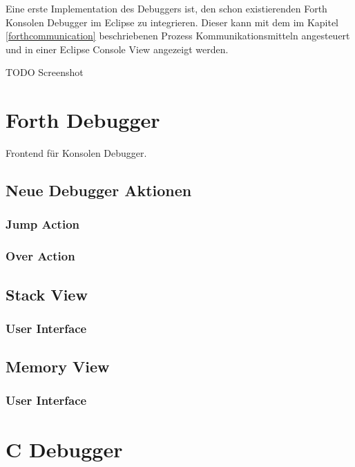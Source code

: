 Eine erste Implementation des Debuggers ist, den schon existierenden Forth Konsolen Debugger im Eclipse zu integrieren. Dieser kann mit dem im Kapitel \ref{forthcommunication} beschriebenen Prozess Kommunikationsmitteln angesteuert und in einer Eclipse Console View angezeigt werden.

TODO Screenshot

\section{Forth Debugger}

Frontend für Konsolen Debugger.

\subsection{Neue Debugger Aktionen}

\subsubsection{Jump Action}

\subsubsection{Over Action}

\subsection{Stack View}

\subsubsection{User Interface}

\subsection{Memory View}

\subsubsection{User Interface}

\section{C Debugger}